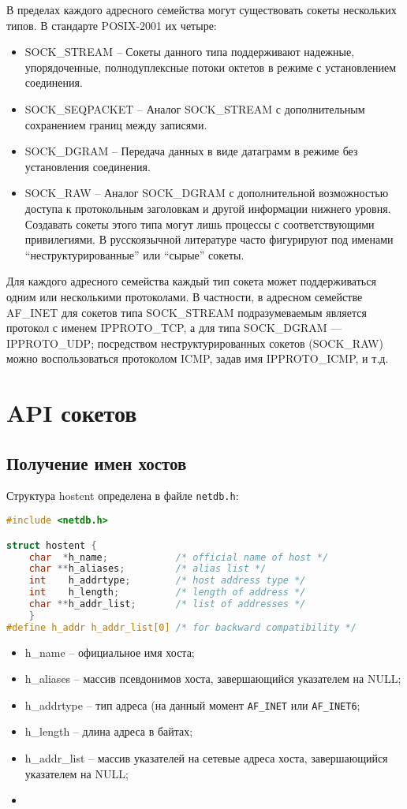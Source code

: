 В пределах каждого адресного семейства могут существовать сокеты нескольких типов. В стандарте POSIX-2001 их четыре:
\begin{itemize}
	\item SOCK\_STREAM -- Сокеты данного типа поддерживают надежные, упорядоченные, полнодуплексные потоки октетов в режиме с установлением соединения. 
	\item SOCK\_SEQPACKET -- Аналог SOCK\_STREAM с дополнительным сохранением границ между записями. 
	\item SOCK\_DGRAM -- Передача данных в виде датаграмм в режиме без установления соединения. 
	\item SOCK\_RAW -- Аналог SOCK\_DGRAM с дополнительной возможностью доступа к протокольным заголовкам и другой информации нижнего уровня. Создавать сокеты этого типа могут лишь процессы с соответствующими привилегиями. В русскоязычной литературе часто фигурируют под именами ``неструктурированные'' или ``сырые'' сокеты.
\end{itemize}

Для каждого адресного семейства каждый тип сокета может поддерживаться одним или несколькими протоколами. В частности, в адресном семействе AF\_INET для сокетов типа SOCK\_STREAM подразумеваемым является протокол с именем IPPROTO\_TCP, а для типа SOCK\_DGRAM --- IPPROTO\_UDP; посредством неструктурированных сокетов (SOCK\_RAW) можно воспользоваться протоколом ICMP, задав имя IPPROTO\_ICMP, и т.д. 

\section{API сокетов}
\subsection{Получение имен хостов}

Структура hostent определена в файле {\tt netdb.h}:
\begin{lstlisting}[language=C]
#include <netdb.h>

struct hostent {
	char  *h_name;            /* official name of host */
	char **h_aliases;         /* alias list */
	int    h_addrtype;        /* host address type */
	int    h_length;          /* length of address */
	char **h_addr_list;       /* list of addresses */
	}
#define h_addr h_addr_list[0] /* for backward compatibility */
\end{lstlisting}
\begin{itemize}
\item h\_name -- официальное имя хоста;
\item h\_aliases -- массив псевдонимов хоста, завершающийся указателем на NULL;
\item h\_addrtype -- тип адреса (на данный момент {\tt AF\_INET} или {\tt AF\_INET6};
\item h\_length -- длина адреса в байтах;
\item h\_addr\_list -- массив указателей на сетевые адреса хоста, завершающийся указателем на NULL;
\item 
\end{itemize}

